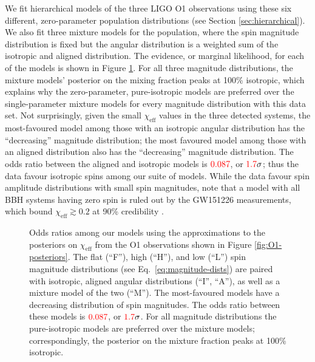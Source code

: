 \documentclass[modern,linenumbers]{aastex61}
\newcommand{\chieff}{\chi_\mathrm{eff}}
\newcommand{\checkme}[1]{\textcolor{red}{#1}}
\newcommand{\OOneSigmaIsoAligned}{\checkme{1.7}}
\newcommand{\OOneOddsIsoAligned}{\checkme{0.087}}
\begin{document}
We fit hierarchical models of the three LIGO O1 observations using
these six different, zero-parameter population distributions (see
Section \ref{sec:hierarchical}).  We also fit three mixture models for
the population, where the spin magnitude distribution is fixed but the
angular distribution is a weighted sum of the isotropic and aligned
distribution.  The evidence, or marginal likelihood, for each of the
models is shown in Figure \ref{fig:O1-odds}.  For all three magnitude
distributions, the mixture models' posterior on the mixing fraction
peaks at 100\% isotropic, which explains why the zero-parameter,
pure-isotropic models are preferred over the single-parameter mixture
models for every magnitude distribution with this data set.  Not
surprisingly, given the small $\chieff$ values in the three detected
systems, the most-favoured model among those with an isotropic angular
distribution has the ``decreasing'' magnitude distribution; the most
favoured model among those with an aligned distribution also has the
``decreasing'' magnitude distribution.  The odds ratio between the
aligned and isotropic models is $\OOneOddsIsoAligned$, or
$\OOneSigmaIsoAligned\sigma$; thus the data favour isotropic spins
among our suite of models.  While the data favour spin amplitude
distributions with small spin magnitudes, note that a model with all
\ac{BBH} systems having zero spin is ruled out by the GW151226
measurements, which bound $\chieff \gtrsim 0.2$ at 90\% credibility
\citep{2016PhRvL.116x1103A}.

\begin{figure}
  \caption{Odds ratios among our models using the approximations to
    the posteriors on $\chieff$ from the O1 observations shown in
    Figure \ref{fig:O1-posteriors}.  The flat (``F''), high (``H''),
    and low (``L'') spin magnitude distributions (see Eq.\
    \eqref{eq:magnitude-dists}) are paired with isotropic, aligned
    angular distributions (``$\mathrm{I}$'', ``$\mathrm{A}$''), as
    well as a mixture model of the two (``$\mathrm{M}$'').  The
    most-favoured models have a decreasing distribution of spin
    magnitudes.  The odds ratio between these models is
    $\OOneOddsIsoAligned$, or $\OOneSigmaIsoAligned\sigma$.  For all
    magnitude distributions the pure-isotropic models are preferred
    over the mixture models; correspondingly, the posterior on the
    mixture fraction peaks at 100\% isotropic.}
  \label{fig:O1-odds}
\end{figure}
\end{document}
